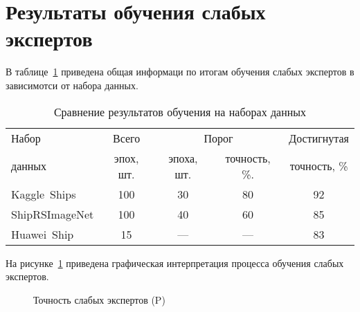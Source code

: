 \section{Результаты обучения слабых экспертов}

В таблице~\ref{tbl:cmp-by-precision} приведена общая информаци по итогам обучения слабых экспертов в зависимотси от набора данных.

\begin{table}[!h]
    \small
    \begin{center}
        \caption{Сравнение результатов обучения на наборах данных}
        \label{tbl:cmp-by-precision}
        \begin{tabular}{|l|c|cc|c|}
            \hline
            Набор  & Всего & \multicolumn{2}{c|}{Порог} & Достигнутая\\\cline{3-4}
            данных & эпох, шт. & эпоха, шт. & точность, \%. & точность, \% \\\hline

            Kaggle~Ships & 100 & 30 & 80 & 92 \\    
            ShipRSImageNet & 100 & 40 & 60 & 85 \\
            Huawei~Ship    & 15 & --- & --- & 83 \\
            \hline
        \end{tabular}
    \end{center}
\end{table}

На рисунке~\ref{plt:precision} приведена графическая интерпретация процесса обучения слабых экспертов.

\begin{figure}[htp]
	\centering
	\captionsetup{justification=centering}
	\caption{Точность слабых экспертов (P)}
	\label{plt:precision}
\end{figure}

